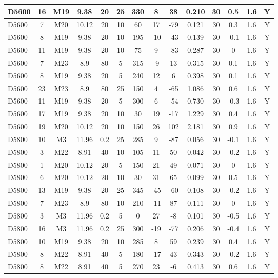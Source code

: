 \documentclass{article}
\begin{document}
\begin{center}
\begin{longtable}{|l|c|c|c|c|c|c|c|c|c|c|c|c|c|}
D5600	&	16	&	M19	&	9.38	&	20	&	25	&	330	&	8	&	38	&	0.210	&	30	&	0.5	&	1.6	&	Y	\\\hline
D5600	&	7	&	M20	&	10.12	&	20	&	10	&	60	&	17	&	-79	&	0.121	&	30	&	0.3	&	1.6	&	Y	\\\hline
D5600	&	8	&	M19	&	9.38	&	20	&	10	&	195	&	-10	&	-43	&	0.139	&	30	&	-0.1	&	1.6	&	Y	\\\hline
D5600	&	11	&	M19	&	9.38	&	20	&	10	&	75	&	9	&	-83	&	0.287	&	30	&	0	&	1.6	&	Y	\\\hline
D5600	&	7	&	M23	&	8.9	&	80	&	5	&	315	&	-9	&	13	&	0.315	&	30	&	0.1	&	1.6	&	Y	\\\hline
D5600	&	8	&	M19	&	9.38	&	20	&	5	&	240	&	12	&	6	&	0.398	&	30	&	0.1	&	1.6	&	Y	\\\hline
D5600	&	23	&	M23	&	8.9	&	80	&	25	&	150	&	4	&	-65	&	1.086	&	30	&	0.6	&	1.6	&	Y	\\\hline
D5600	&	11	&	M19	&	9.38	&	20	&	5	&	300	&	6	&	-54	&	0.730	&	30	&	-0.3	&	1.6	&	Y	\\\hline
D5600	&	17	&	M19	&	9.38	&	20	&	10	&	30	&	19	&	-17	&	1.229	&	30	&	0.4	&	1.6	&	Y	\\\hline
D5600	&	19	&	M20	&	10.12	&	20	&	10	&	150	&	26	&	102	&	2.181	&	30	&	0.9	&	1.6	&	Y	\\\hline
D5800	&	10	&	M3	&	11.96	&	0.2	&	25	&	285	&	9	&	-87	&	0.056	&	30	&	-0.1	&	1.6	&	Y	\\\hline
D5800	&	3	&	M22	&	8.91	&	40	&	10	&	105	&	11	&	50	&	0.042	&	30	&	-0.2	&	1.6	&	Y	\\\hline
D5800	&	1	&	M20	&	10.12	&	20	&	5	&	150	&	21	&	49	&	0.071	&	30	&	0	&	1.6	&	Y	\\\hline
D5800	&	6	&	M20	&	10.12	&	20	&	10	&	30	&	31	&	65	&	0.099	&	30	&	0.5	&	1.6	&	Y	\\\hline
D5800	&	13	&	M19	&	9.38	&	20	&	25	&	345	&	-45	&	-60	&	0.108	&	30	&	-0.2	&	1.6	&	Y	\\\hline
D5800	&	7	&	M23	&	8.9	&	80	&	10	&	210	&	-11	&	87	&	0.111	&	30	&	0	&	1.6	&	Y	\\\hline
D5800	&	3	&	M3	&	11.96	&	0.2	&	5	&	0	&	27	&	-8	&	0.101	&	30	&	-0.5	&	1.6	&	Y	\\\hline
D5800	&	16	&	M3	&	11.96	&	0.2	&	25	&	300	&	-19	&	-77	&	0.206	&	30	&	-0.4	&	1.6	&	Y	\\\hline
D5800	&	10	&	M19	&	9.38	&	20	&	10	&	285	&	8	&	59	&	0.239	&	30	&	0.4	&	1.6	&	Y	\\\hline
D5800	&	8	&	M22	&	8.91	&	40	&	5	&	180	&	-17	&	43	&	0.343	&	30	&	-0.2	&	1.6	&	Y	\\\hline
D5800	&	8	&	M22	&	8.91	&	40	&	5	&	270	&	23	&	-6	&	0.413	&	30	&	0.6	&	1.6	&	Y	\\\hline

\end{longtable}
\end{center}
\end{document}

